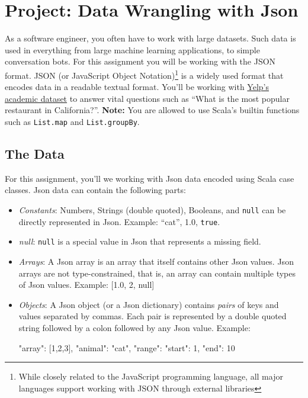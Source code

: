 \chapter{Project: Data Wrangling with Json}

\noindent As a software engineer, you often have to work with large datasets.
Such data is used in everything from large machine learning applications, to
simple conversation bots. For this assignment you will be working
with the JSON format. JSON (or JavaScript Object Notation)\footnote{While
closely related to the JavaScript programming language, all major languages
support working with JSON through external libraries} is a widely used format
that encodes data in a readable textual format. You'll be working with
\href{https://www.yelp.com/dataset}{Yelp's academic dataset} to answer vital
questions such as ``What is the most popular restaurant in California?''.
\textbf{Note:} You are allowed to use Scala's builtin functions such as
\verb|List.map| and \verb|List.groupBy|.

\section{The Data}
For this assignment, you'll we working with Json data encoded using Scala case
classes. Json data can contain the following parts:
\begin{itemize}
    \item \textit{Constants}: Numbers, Strings (double quoted), Booleans, and
    \texttt{null} can be directly represented in Json. Example: ``cat'', 1.0,
    \texttt{true}.

    \item \textit{null}: \texttt{null} is a special value in Json that
    represents a missing field.

    \item \textit{Arrays}: A Json array is an array that itself contains other
    Json values. Json arrays are not type-constrained, that is, an array can
    contain multiple types of Json values. Example: [1.0, 2, null]

    \item \textit{Objects}: A Json object (or a Json dictionary) contains
    \textit{pairs} of keys and values separated by commas. Each pair is
    represented by a double quoted string followed by a colon followed by any
    Json value. Example:
    \begin{scalacode}
    {
        "array": [1,2,3],
        "animal": "cat",
        "range": { "start": 1, "end": 10 }
    }
    \end{scalacode}
\end{itemize}

